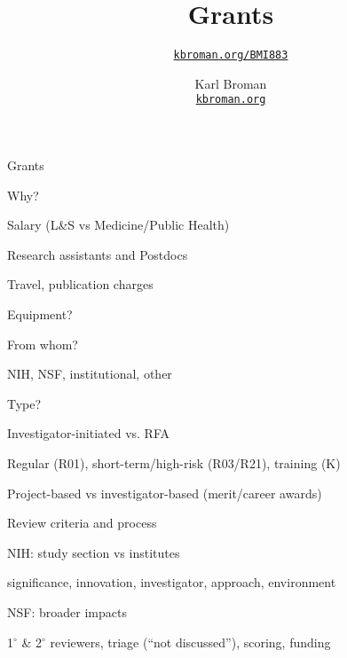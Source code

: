 \documentclass[aspectratio=169,12pt,t]{beamer}
\title{Grants}
\subtitle{}
\author{\href{https://kbroman.org/BMI883}{\tt kbroman.org/BMI883} }
\institute{}
\date{\small \hspace{3in} Karl Broman \\
  \hspace{3in} \href{https://kbroman.org}{\color{foreground}
    \small \tt kbroman.org}}
\begin{document}
{




\begin{frame}{Grants}

\bi
\item Why?
    \bi
    \item Salary (L\&S vs Medicine/Public Health)
    \item Research assistants and Postdocs
    \item Travel, publication charges
    \item Equipment?
    \ei
\item From whom?
    \bi
    \item NIH, NSF, institutional, other
    \ei
\item Type?
    \bi
    \item Investigator-initiated vs. RFA
    \item Regular (R01), short-term/high-risk (R03/R21), training (K)
    \item Project-based vs investigator-based (merit/career awards)
    \ei
\item Review criteria and process
    \bi
    \item NIH: study section vs institutes
    \item {\footnotesize significance, innovation, investigator, approach, environment}
    \item NSF: broader impacts
    \item 1$^{\circ}$ \& 2$^{\circ}$ reviewers, triage (``not discussed''), scoring, funding
    \ei
\ei

\end{frame}


}
\end{document}
